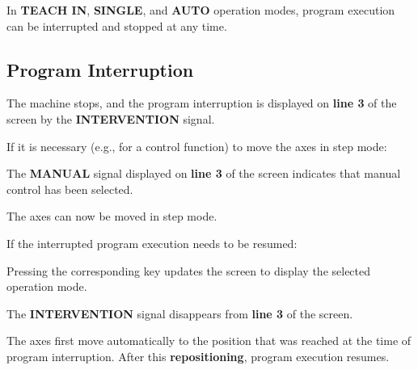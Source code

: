 In \textbf{TEACH IN}, \textbf{SINGLE}, and \textbf{AUTO} operation modes,  
program execution can be interrupted and stopped at any time.

\subsection{Program Interruption}

\begin{itemize}
\end{itemize}

The machine stops, and the program interruption is displayed on \textbf{line 3} of the screen by the \textbf{INTERVENTION} signal.

If it is necessary (e.g., for a control function) to move the axes in step mode:

\begin{itemize}
\end{itemize}

The \textbf{MANUAL} signal displayed on \textbf{line 3} of the screen indicates that manual control has been selected.

The axes can now be moved in step mode.

If the interrupted program execution needs to be resumed:

\begin{itemize}
\end{itemize}

Pressing the corresponding key updates the screen to display the selected operation mode.

\begin{itemize}
\end{itemize}

The \textbf{INTERVENTION} signal disappears from \textbf{line 3} of the screen.

The axes first move automatically to the position that was reached at the time of program interruption.  
After this \textbf{repositioning}, program execution resumes.

\notes

